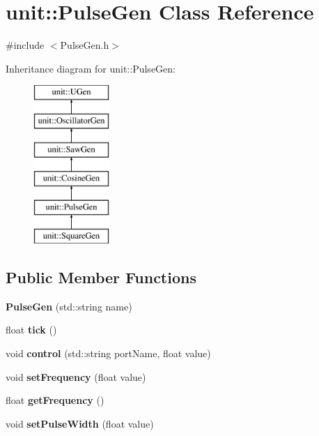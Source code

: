\hypertarget{classunit_1_1PulseGen}{}\section{unit\+:\+:Pulse\+Gen Class Reference}
\label{classunit_1_1PulseGen}


{\ttfamily \#include $<$Pulse\+Gen.\+h$>$}

Inheritance diagram for unit\+:\+:Pulse\+Gen\+:\begin{figure}[H]
\begin{center}
\leavevmode
\includegraphics[height=6.000000cm]{classunit_1_1PulseGen}
\end{center}
\end{figure}
\subsection*{Public Member Functions}
\begin{DoxyCompactItemize}
\item 
{\bfseries Pulse\+Gen} (std\+::string name)\hypertarget{classunit_1_1PulseGen_a466bdb3fcc244e66f2c29a9a517d4b85}{}\label{classunit_1_1PulseGen_a466bdb3fcc244e66f2c29a9a517d4b85}

\item 
float {\bfseries tick} ()\hypertarget{classunit_1_1PulseGen_a8b09b8d3cf11eb6a315bdd9b6347227d}{}\label{classunit_1_1PulseGen_a8b09b8d3cf11eb6a315bdd9b6347227d}

\item 
void {\bfseries control} (std\+::string port\+Name, float value)\hypertarget{classunit_1_1PulseGen_a581c649900c094728f4b587fb36c4f56}{}\label{classunit_1_1PulseGen_a581c649900c094728f4b587fb36c4f56}

\item 
void {\bfseries set\+Frequency} (float value)\hypertarget{classunit_1_1PulseGen_af4a027e50251040d914cdf18a87d7a73}{}\label{classunit_1_1PulseGen_af4a027e50251040d914cdf18a87d7a73}

\item 
float {\bfseries get\+Frequency} ()\hypertarget{classunit_1_1PulseGen_aa4b24157a5f5a95d1ccf0cf639598b8f}{}\label{classunit_1_1PulseGen_aa4b24157a5f5a95d1ccf0cf639598b8f}

\item 
void {\bfseries set\+Pulse\+Width} (float value)\hypertarget{classunit_1_1PulseGen_a9be5874432ee5e966542bc1b568faa61}{}\label{classunit_1_1PulseGen_a9be5874432ee5e966542bc1b568faa61}

\end{DoxyCompactItemize}
